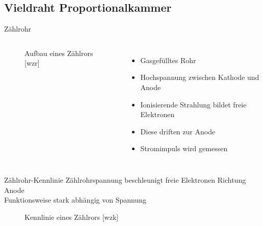 \subsection{Vieldraht Proportionalkammer}

\begin{frame}{Zählrohr}
    \begin{columns}[T]
    
			\begin{figure}[htbp]
			  \centering
			  
			  \caption{Aufbau eines Zählrors [wzr]}
			\end{figure}
			
	    	\begin{itemize}
	    	  \item Gasgefülltes Rohr
			  \item Hochspannung zwischen Kathode und Anode
			  \item Ionisierende Strahlung bildet freie Elektronen
			  \item Diese driften zur Anode	
			  \item Stromimpuls wird gemessen
			\end{itemize}
    \end{columns}
\end{frame}


\begin{frame}{Zählrohr-Kennlinie}
	Zählrohrspannung beschleunigt freie Elektronen Richtung Anode \\
	Funktionsweise stark abhängig von Spannung
	
	\begin{figure}[htbp]
	  \centering
	  
	  \caption{Kennlinie eines Zählrors [wzk]}
	\end{figure}
	
\end{frame}	


